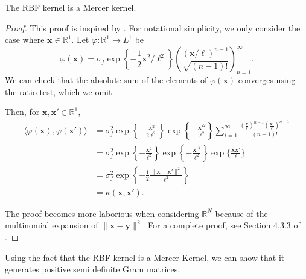 \begin{theorem}\label{thm:rbf-mercer}
    The RBF kernel is a Mercer kernel.
\end{theorem}
\begin{proof}
    This proof is inspired by \cite{shashua2009}.
    For notational simplicity, we only consider the case where $\mathbf{x} \in \mathbb{R}^{1}$.
    Let $\varphi: \mathbb{R}^{1} \to L^1$ be
    \begin{equation*}
        \varphi(\mathbf{x}) = \sigma_f \exp\left\{-\frac12 \mathbf{x}^2 / \ell^2\right\} \left(\frac{ (\mathbf{x} / \ell)^{n - 1} }{ \sqrt{(n - 1)!} }\right)_{n=1}^{\infty}.
    \end{equation*}
    We can check that the absolute sum of the elements of $\varphi(\mathbf{x})$ converges using the ratio test, which we omit.

    Then, for $\mathbf{x}, \mathbf{x'} \in \mathbb{R}^{1}$,
    \begin{align}
        \langle \varphi(\mathbf{x}), \varphi(\mathbf{x'}) \rangle
        & = \sigma_f^2
        \exp \left\{ -\frac{\mathbf{x}^2}{2\ell^2} \right\}
        \exp \left\{ -\frac{ \mathbf{x'}^2}{\ell^2} \right\}
        \sum\limits_{i=1}^{\infty}
        \frac{ (\frac{\mathbf{x}}{\ell})^{n - 1} (\frac{\mathbf{x'}}{\ell})^{n - 1}}{ (n - 1)! } \\
        & = \sigma_f^2
        \exp \left\{ -\frac{ \mathbf{x}^2}{\ell^2} \right\}
        \exp \left\{ -\frac{ \mathbf{x'}^2}{\ell^2} \right\}
        \exp \{ \frac{\mathbf{x} \mathbf{x'}}{ \ell} \} \\
        & = \sigma_f^2 \exp \left\{ -\frac12 \frac{ \lVert \mathbf{x} - \mathbf{x'} \rVert^2 }{ \ell^2 } \right\} \\
        & = \kappa(\mathbf{x}, \mathbf{x'}).
    \end{align}

    The proof becomes more laborious when considering $\mathbb{R}^{N}$ because of the multinomial expansion of $\lVert \mathbf{x} - \mathbf{y} \rVert^2$.
    For a complete proof, see Section 4.3.3 of \cite{shashua2009}.
\end{proof}

Using the fact that the RBF kernel is a Mercer Kernel, we can show that it generates positive semi definite Gram matrices.

